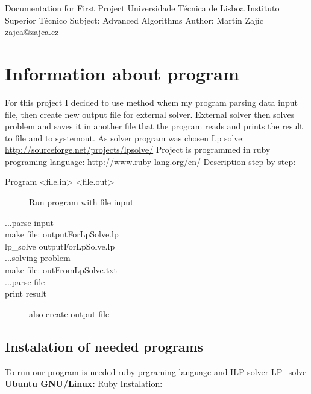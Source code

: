 \documentclass[a4paper,12pt]{article}
\renewcommand{\b}[1]{\textbf{#1}} %
\begin{document}
\begin{titlepage}
\begin{center}
Documentation for First Project\newline
\newline
Universidade Técnica de Lisboa\newline
Instituto Superior Técnico\newline
\newline
Subject: Advanced Algorithms\newline
Author: Martin Zajíc zajca@zajca.cz\newline
\newline
\end{center}
\end{titlepage}
\section{Information about program}
For this project I decided to use method whem my program parsing data input file, then create new output file for external solver. External solver then solves problem and saves it in another file that the program reads and prints the result to file and to systemout.
\newline
\newline
As solver program was chosen Lp solve: \href{http://sourceforge.net/projects/lpsolve/}{http://sourceforge.net/projects/lpsolve/}
\newline
\newline
Project is programmed in ruby programing language: \href{http://www.ruby-lang.org/en/}{http://www.ruby-lang.org/en/}
\newline
\newline
Description step-by-step:
\begin{description}
 \item[Program <file.in> <file.out>] Run program with file input
 \item[...parse input]
 \item[make file: outputForLpSolve.lp]
 \item[lp\_solve outputForLpSolve.lp]
 \item[...solving problem]
 \item[make file: outFromLpSolve.txt]
 \item[...parse file]
 \item[print result] also create output file
 \end{description}

\subsection{Instalation of needed programs}
To run our program is needed ruby prgraming language and ILP solver LP\_solve\newline
\newline
\b{Ubuntu GNU/Linux:} \newline
Ruby Instalation:
\end{document}
